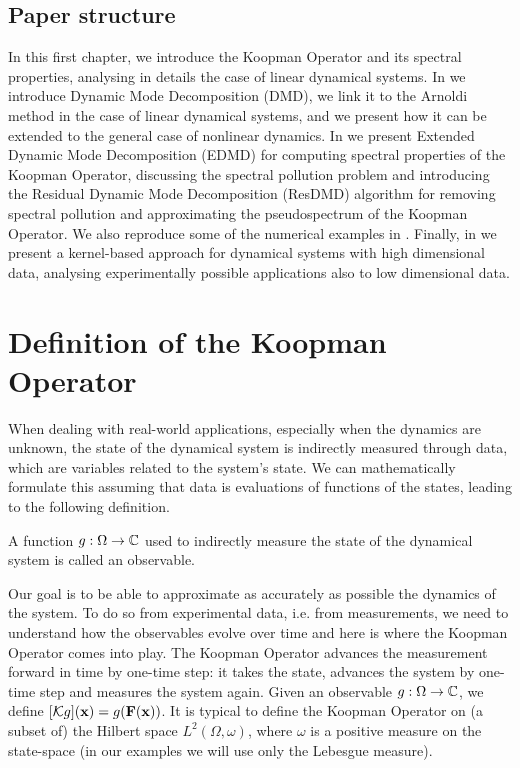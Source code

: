 \subsection{Paper structure}
In this first chapter, we introduce the Koopman Operator and its spectral properties, analysing in details the case of linear dynamical systems. In  we introduce Dynamic Mode Decomposition (DMD), we link it to the Arnoldi method in the case of linear dynamical systems, and we present how it can be extended to the general case of nonlinear dynamics. In  we present Extended Dynamic Mode Decomposition (EDMD) for computing spectral properties of the Koopman Operator, discussing the spectral pollution problem and introducing the Residual Dynamic Mode Decomposition (ResDMD) algorithm for removing spectral pollution and approximating the pseudospectrum of the Koopman Operator. We also reproduce some of the numerical examples in \cite{colbrook_rigorous_2021}. Finally, in  we present a kernel-based approach for dynamical systems with high dimensional data, analysing experimentally possible applications also to low dimensional data.

\section{Definition of the Koopman Operator}
When dealing with real-world applications, especially when the dynamics are unknown, the state of the dynamical system is indirectly measured through data, which are variables related to the system's state. We can mathematically formulate this assuming that data is evaluations of functions of the states, leading to the following definition.

\begin{definition}[Observable]
A function $g:\Omega\to\mathbb{C}$ used to indirectly measure the state of the dynamical system is called an observable. 
\end{definition}

Our goal is to be able to approximate as accurately as possible the dynamics of the system. To do so from experimental data, i.e. from measurements, we need to understand how the observables evolve over time and here is where the Koopman Operator comes into play. The Koopman Operator advances the measurement forward in time by one-time step: it takes the state, advances the system by one-time step and measures the system again. Given an observable $g:\Omega\to\mathbb{C}$, we define $[\mathcal{K}g](\vb{x}) = g(\vb{F}(\vb{x}))$. It is typical to define the Koopman Operator on (a subset of) the Hilbert space $L^2(\Omega, \omega)$, where $\omega$ is a positive measure on the state-space (in our examples we will use only the Lebesgue measure).

